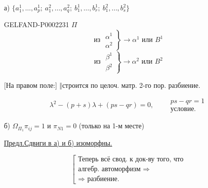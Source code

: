 а) $\{a_1^1,\ldots,a_p^1;\ a_1^2,\ldots,a_q^2;\ b_1^1,\ldots,b_r^1;\ b_1^2,\ldots,b_s^2\}$



\begin{GelfandAdjacentEvidence}{GELFAND-P000223}{1}
$\Pi$
\begin{equation*}
 \text{из }\left.\begin{gathered}\alpha^1\\\alpha^2\end{gathered}\right\}
 \longrightarrow\alpha^1\text{ или }B^1
\end{equation*}
\begin{equation*}
 \text{из }\left.\begin{gathered}\beta^1\\\beta^2\end{gathered}\right\}
 \longrightarrow\alpha^2\text{ или }B^2
\end{equation*}
\end{GelfandAdjacentEvidence}

[На правом поле:] $\Vert$\quad строится по целоч. матр. 2-го пор. разбиение.



\begin{equation*}
\lambda^2-(p+s)\lambda+(ps-qr)=0,\qquad
\begin{gathered}\boxed{\boxed{ps-qr=1}}\\\text{условие.}\end{gathered}
\end{equation*}



б) $\Omega_{\Pi_1}$\qquad $\pi_{ij}=1$ и $\pi_{N1}=0$ (только на 1-м месте)



\underline{\underline{Предл.}}\quad\underline{Сдвиги в а) и б) изоморфны.}



\begin{equation*}
\left[\begin{gathered}
\text{Теперь всё свод. к док-ву того, что}\\
\text{алгебр. автоморфизм }\Rightarrow\\
\Rightarrow\text{ разбиение.}
\end{gathered}\right.
\end{equation*}



